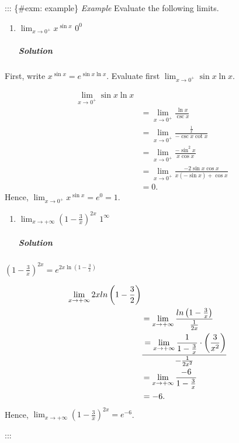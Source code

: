 \documentclass[
  letterpaper,
  DIV=11,
  numbers=noendperiod]{scrartcl}
\let\oldsubparagraph\subparagraph
\renewcommand{\subparagraph}[1]{\oldsubparagraph{#1}\mbox{}}
\theoremstyle{plain}
\theoremstyle{remark}
\begin{document}
::: \{\#exm: example\} \emph{Example} Evaluate the following limits.

\begin{enumerate}
\def\labelenumi{\arabic{enumi}.}
\item
  \(\displaystyle\lim_{x\to 0^+}{x^{\sin x}}\) \(0^0\)

  \hypertarget{solution-4}{%
  \subparagraph{\texorpdfstring{\emph{Solution}}{Solution}}\label{solution-4}}
\end{enumerate}

First, write \(x^{\sin x}=e^{\sin x \ln x}\). Evaluate first
\(\displaystyle\lim_{x\to 0^+}{\sin x \ln x}\).

\[
\begin{aligned}
\displaystyle\lim_{x\to 0^+}{\sin x \ln x}\\&=\displaystyle\lim_{x\to 0^+}{\frac{\ln x}{\csc x}}\\&=\displaystyle\lim_{x\to 0^+}{\frac{\frac{1}{x}}{-\csc x \cot x}}\\&=\displaystyle\lim_{x\to 0^+}{\frac{-\sin^2 x}{x \cos x}}\\&=\displaystyle\lim_{x\to 0^+}{\frac{-2\sin x \cos x}{x(-\sin x)+\cos x}}\\&=0.
\end{aligned}
\] Hence, \(\displaystyle\lim_{x\to 0^+}{x^{\sin x}}=e^0=1\).

\begin{enumerate}
\def\labelenumi{\arabic{enumi}.}
\setcounter{enumi}{1}
\item
  \(\displaystyle\lim_{x\to +\infty}{\left(1-\frac{3}{x}\right)^{2x}}\)
  \(1^\infty\)

  \hypertarget{solution-5}{%
  \subparagraph{\texorpdfstring{\emph{Solution}}{Solution}}\label{solution-5}}
\end{enumerate}

\(\left(1-\frac{3}{x}\right)^{2x}=e^{2x\ln \left(1-\frac{3}{x}\right)}\)

\[
\begin{aligned}
\displaystyle\lim_{x\to +\infty}{2x ln \left(1-\frac{3}{2}\right)}\\&=\displaystyle\lim_{x\to +\infty}{\frac{ln \left(1-\frac{3}{x}\right)}{\frac{1}{2x}}}\\&=\displaystyle\lim_{x\to +\infty}{\frac{1}{1-\frac{3}{x}}}\cdot \left(\frac{3}{x^2}\right)\over-\frac{1}{2x^2}\\&=\displaystyle\lim_{x\to +\infty}{\frac{-6}{1-\frac{3}{x}}}\\&=-6.
\end{aligned}
\] Hence,
\(\displaystyle\lim_{x\to +\infty}{\left(1-\frac{3}{x}\right)^{2x}}=e^{-6}\).

:::
\end{document}
